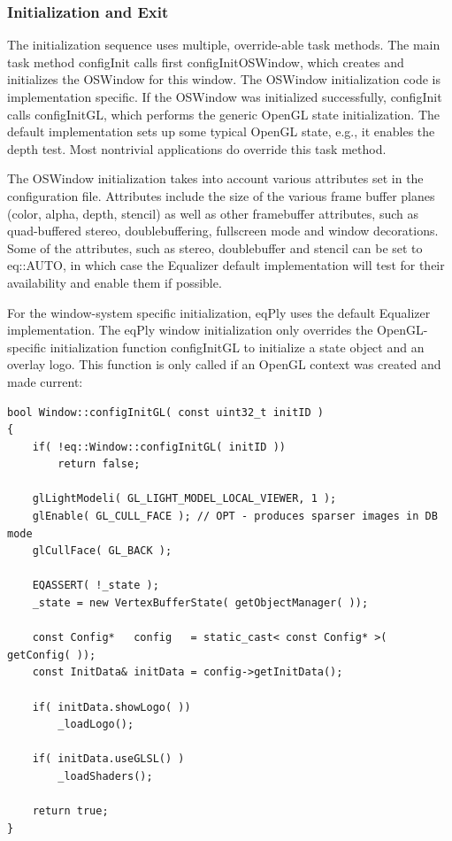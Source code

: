 \documentclass[10pt,a4]{scrartcl}
\begin{document}
\subsubsection{Initialization and Exit}

The initialization sequence uses multiple, override-able task
methods. The main task method \textsf{configInit} calls first
\textsf{configInitOSWindow}, which creates and initializes the
\textsf{OSWindow} for this window. The \textsf{OSWindow} initialization
code is implementation specific. If the \textsf{OSWindow} was
initialized successfully, \textsf{configInit} calls
\textsf{configInitGL}, which performs the generic OpenGL state
initialization. The default implementation sets up some typical OpenGL
state, e.g., it enables the depth test. Most nontrivial applications
do override this task method.

The \textsf{OSWindow} initialization takes into account various
attributes set in the configuration file. Attributes include the size of
the various frame buffer planes (color, alpha, depth, stencil) as well
as other framebuffer attributes, such as quad-buffered stereo,
doublebuffering, fullscreen mode and window decorations. Some of the
attributes, such as stereo, doublebuffer and stencil can be set to
\textsf{eq::AUTO}, in which case the Equalizer default implementation
will test for their availability and enable them if possible.

For the window-system specific initialization, \textsf{eqPly} uses the
default Equalizer implementation. The \textsf{eqPly} window
initialization only overrides the OpenGL-specific initialization
function \textsf{configInitGL} to initialize a state object and
an overlay logo. This function is only called if an OpenGL context was
created and made current:

{\footnotesize\begin{lstlisting}
bool Window::configInitGL( const uint32_t initID )
{
    if( !eq::Window::configInitGL( initID ))
        return false;

    glLightModeli( GL_LIGHT_MODEL_LOCAL_VIEWER, 1 );
    glEnable( GL_CULL_FACE ); // OPT - produces sparser images in DB mode
    glCullFace( GL_BACK );

    EQASSERT( !_state );
    _state = new VertexBufferState( getObjectManager( ));
    
    const Config*   config   = static_cast< const Config* >( getConfig( ));
    const InitData& initData = config->getInitData();

    if( initData.showLogo( ))
        _loadLogo();

    if( initData.useGLSL() )
        _loadShaders();

    return true;
}
\end{lstlisting}}%
\end{document}

